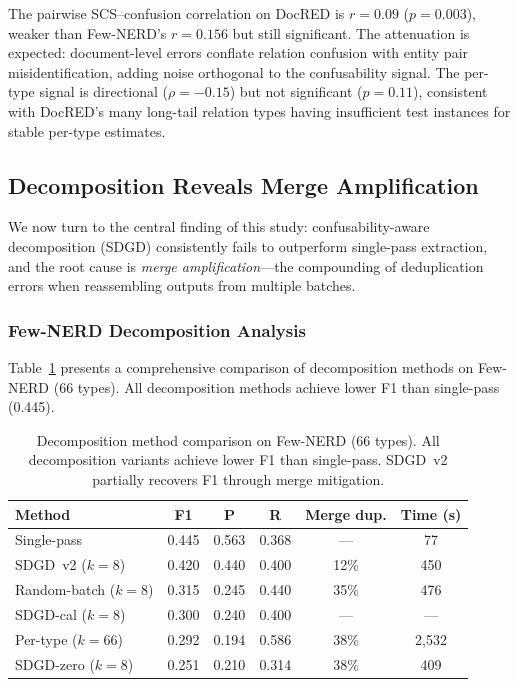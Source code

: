 \documentclass[11pt,a4paper]{article}
\begin{document}
The pairwise SCS--confusion correlation on DocRED is $r=0.09$ ($p=0.003$), weaker than Few-NERD's $r=0.156$ but still significant. The attenuation is expected: document-level errors conflate relation confusion with entity pair misidentification, adding noise orthogonal to the confusability signal. The per-type signal is directional ($\rho=-0.15$) but not significant ($p=0.11$), consistent with DocRED's many long-tail relation types having insufficient test instances for stable per-type estimates.

\subsection{Decomposition Reveals Merge Amplification}
\label{sec:decomposition}

We now turn to the central finding of this study: confusability-aware decomposition (SDGD) consistently fails to outperform single-pass extraction, and the root cause is \emph{merge amplification}---the compounding of deduplication errors when reassembling outputs from multiple batches.

\subsubsection{Few-NERD Decomposition Analysis}

Table~\ref{tab:fewnerd-decomp} presents a comprehensive comparison of decomposition methods on Few-NERD (66 types). All decomposition methods achieve lower F1 than single-pass (0.445).

\begin{table}[t]
\centering
\caption{Decomposition method comparison on Few-NERD (66 types). All decomposition variants achieve lower F1 than single-pass. SDGD~v2 partially recovers F1 through merge mitigation.}
\label{tab:fewnerd-decomp}
\begin{tabular}{lccccc}
\toprule
\textbf{Method} & \textbf{F1} & \textbf{P} & \textbf{R} & \textbf{Merge dup.} & \textbf{Time (s)} \\
\midrule
Single-pass           & 0.445 & 0.563 & 0.368 & ---  & 77 \\
SDGD~v2 ($k\!=\!8$)  & 0.420 & 0.440 & 0.400 & 12\% & 450 \\
Random-batch ($k\!=\!8$) & 0.315 & 0.245 & 0.440 & 35\% & 476 \\
SDGD-cal ($k\!=\!8$) & 0.300 & 0.240 & 0.400 & ---  & --- \\
Per-type ($k\!=\!66$) & 0.292 & 0.194 & 0.586 & 38\% & 2{,}532 \\
SDGD-zero ($k\!=\!8$)& 0.251 & 0.210 & 0.314 & 38\% & 409 \\
\bottomrule
\end{tabular}
\end{table}
\end{document}
